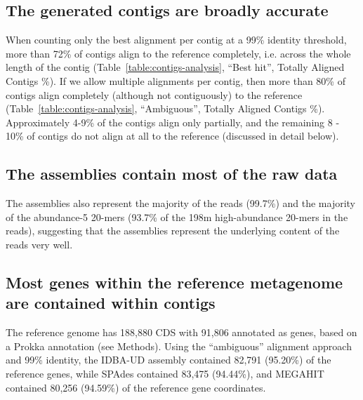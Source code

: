 \documentclass[10pt,a4paper,twocolumn]{article}
\begin{document}
\subsection*{The generated contigs are broadly accurate} 

When counting only the best alignment per contig at a 99\%
identity threshold, more than 72\% of contigs align to the reference
completely, i.e. across the whole length of the contig (Table~\ref{table:contigs-analysis}, ``Best hit'', Totally Aligned Contigs \%).  If we allow
multiple alignments per contig, then more than 80\% of contigs align
completely (although not contiguously) to the reference (Table~\ref{table:contigs-analysis}, ``Ambiguous'', Totally Aligned Contigs \%).
Approximately 4-9\% of the contigs align only partially, and the
remaining 8 - 10\% of contigs do not align at all to the reference
(discussed in detail below).

\subsection*{The assemblies contain most of the raw data}

The assemblies also represent the majority of the reads (99.7\%) and
the majority of the abundance-5 20-mers (93.7\% of the 198m
high-abundance 20-mers in the reads), suggesting that the assemblies
represent the underlying content of the reads very well.

\subsection*{Most genes within the reference metagenome are contained within contigs}

The reference genome has 188,880 CDS with 91,806 annotated as genes,
based on a Prokka annotation (see Methods).
Using the ``ambiguous'' alignment approach and 99\% identity, the
IDBA-UD assembly contained 82,791 (95.20\%) of the reference genes,
while SPAdes contained 83,475 (94.44\%), and
MEGAHIT contained 80,256 (94.59\%) of the reference gene
coordinates.

\end{document}
